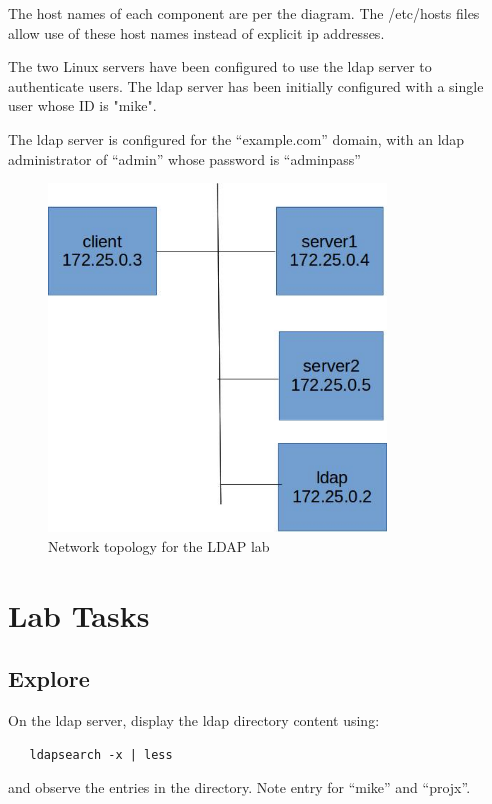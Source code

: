 The host names of each component are per the diagram.  The /etc/hosts files
allow use of these host names instead of explicit ip addresses.

The two Linux servers have been configured to use the ldap server to 
authenticate users.  The ldap server has been initially configured
with a single user whose ID is "mike".

The ldap server is configured for the ``example.com'' domain, with
an ldap administrator of ``admin'' whose password is ``adminpass''

\begin{figure}[H]
\begin{center}
\includegraphics [width=0.8\textwidth]{ldap.jpg}
\end{center}
\caption{Network topology for the LDAP lab}
\label{fig:topology}
\end{figure}

\section{Lab Tasks}
\subsection{Explore}
On the ldap server, display the ldap directory content using:
\begin{verbatim}
   ldapsearch -x | less
\end{verbatim}
\noindent and observe the entries in the directory. Note entry for ``mike'' and
``projx''.

